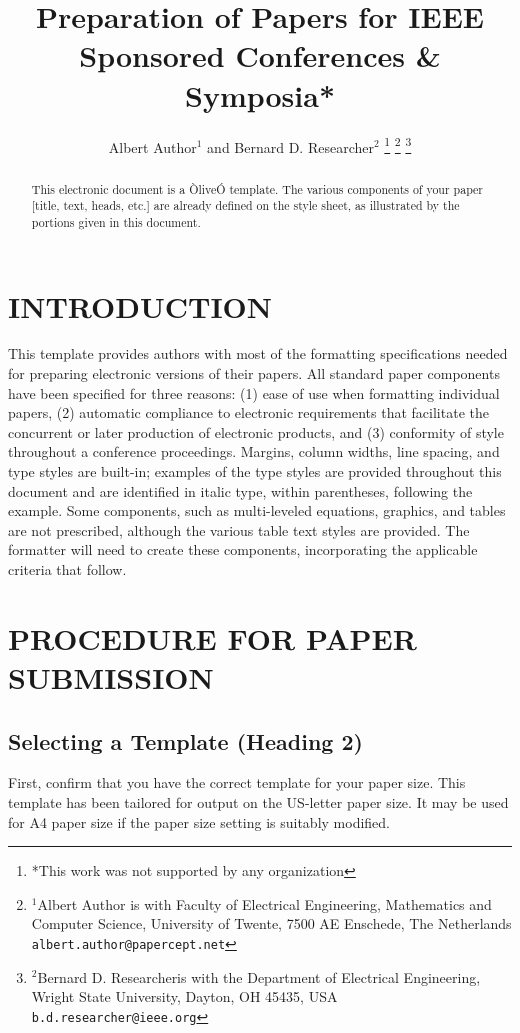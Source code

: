 \documentclass[letterpaper, 10 pt, conference]{ieeeconf}  %
\title{\LARGE \bf
Preparation of Papers for IEEE Sponsored Conferences \& Symposia*
}
\author{Albert Author$^{1}$ and Bernard D. Researcher$^{2}$%
\thanks{*This work was not supported by any organization}%
\thanks{$^{1}$Albert Author is with Faculty of Electrical Engineering, Mathematics and Computer Science,
        University of Twente, 7500 AE Enschede, The Netherlands
        {\tt\small albert.author@papercept.net}}%
\thanks{$^{2}$Bernard D. Researcheris with the Department of Electrical Engineering, Wright State University,
        Dayton, OH 45435, USA
        {\tt\small b.d.researcher@ieee.org}}%
}
\begin{document}
\maketitle
\thispagestyle{empty}
\pagestyle{empty}


\begin{abstract}

This electronic document is a ÒliveÓ template. The various components of your paper [title, text, heads, etc.] are already defined on the style sheet, as illustrated by the portions given in this document.

\end{abstract}


\section{INTRODUCTION}

This template provides authors with most of the formatting specifications needed for preparing electronic versions of their papers. All standard paper components have been specified for three reasons: (1) ease of use when formatting individual papers, (2) automatic compliance to electronic requirements that facilitate the concurrent or later production of electronic products, and (3) conformity of style throughout a conference proceedings. Margins, column widths, line spacing, and type styles are built-in; examples of the type styles are provided throughout this document and are identified in italic type, within parentheses, following the example. Some components, such as multi-leveled equations, graphics, and tables are not prescribed, although the various table text styles are provided. The formatter will need to create these components, incorporating the applicable criteria that follow.

\section{PROCEDURE FOR PAPER SUBMISSION}

\subsection{Selecting a Template (Heading 2)}

First, confirm that you have the correct template for your paper size. This template has been tailored for output on the US-letter paper size. 
It may be used for A4 paper size if the paper size setting is suitably modified.
\end{document}
